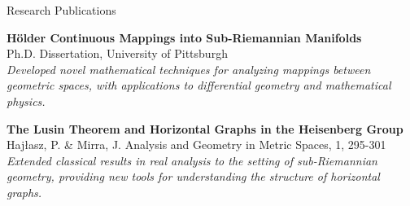 \begin{rubric}{Research Publications}

\entry*[2018]
	\textbf{Hölder Continuous Mappings into Sub-Riemannian Manifolds}\\
	Ph.D. Dissertation, University of Pittsburgh\\
	\emph{Developed novel mathematical techniques for analyzing mappings between geometric spaces, with applications to differential geometry and mathematical physics.}

\entry*[2013]
	\textbf{The Lusin Theorem and Horizontal Graphs in the Heisenberg Group}\\
	Hajłasz, P. \& Mirra, J. Analysis and Geometry in Metric Spaces, 1, 295-301\\
	\emph{Extended classical results in real analysis to the setting of sub-Riemannian geometry, providing new tools for understanding the structure of horizontal graphs.}

\end{rubric}
